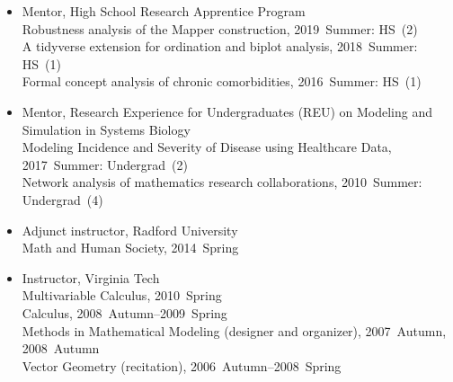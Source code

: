 \documentclass[10pt,a4paper]{article}
\begin{document}
\begin{itemize}[label=$\circ$,nolistsep]
\item
Mentor, High School Research Apprentice Program \\
Robustness analysis of the Mapper construction, 2019~Summer: HS~(2) \\
A tidyverse extension for ordination and biplot analysis, 2018~Summer: HS~(1) \\
Formal concept analysis of chronic comorbidities, 2016~Summer: HS~(1)
\item
Mentor, Research Experience for Undergraduates (REU) on Modeling and Simulation in Systems Biology \\
Modeling Incidence and Severity of Disease using Healthcare Data, 2017~Summer: Undergrad~(2) \\
Network analysis of mathematics research collaborations, 2010~Summer: Undergrad~(4)
\item
Adjunct instructor, Radford University \\
Math and Human Society, 2014~Spring
\item
Instructor, Virginia Tech \\
Multivariable Calculus, 2010~Spring \\
Calculus, 2008~Autumn--2009~Spring \\
Methods in Mathematical Modeling (designer and organizer), 2007~Autumn, 2008~Autumn \\
Vector Geometry (recitation), 2006~Autumn--2008~Spring

\end{itemize}
\end{document}
